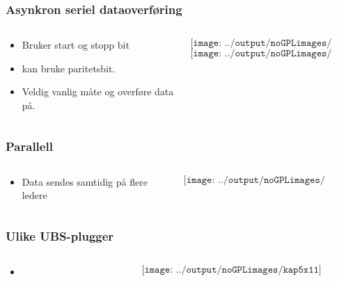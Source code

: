 \documentclass[aspectratio=169,xcolor=dvipsnames]{beamer}
\begin{document}
\begin{frame}
	\frametitle{Asynkron seriel dataoverføring}
	\begin{columns}
		\begin{column}{0.5\textwidth}

			\begin{itemize}
				\item Bruker start og stopp bit
				\item kan bruke paritetsbit. 
				\item Veldig vanlig måte og overføre data på. 
			\end{itemize}

			
		\end{column}

		\begin{column}{0.5\textwidth}
	$$\texttt{[image: ../output/noGPLimages/kap5x08]}$$
	$$\texttt{[image: ../output/noGPLimages/kap5x09]}$$
		\end{column}
	\end{columns}
\end{frame}
\begin{frame}
	\frametitle{Parallell}
	\begin{columns}
		\begin{column}{0.5\textwidth}

			\begin{itemize}
				\item Data sendes samtidig på flere ledere
			\end{itemize}

			
		\end{column}

		\begin{column}{0.5\textwidth}
	$$\texttt{[image: ../output/noGPLimages/kap5x10]}$$
		\end{column}
	\end{columns}
\end{frame}
\begin{frame}
	\frametitle{Ulike UBS-plugger}
	\begin{columns}
		\begin{column}{0.5\textwidth}

			\begin{itemize}
				\item      
			\end{itemize}

			
		\end{column}

		\begin{column}{0.5\textwidth}
	$$\texttt{[image: ../output/noGPLimages/kap5x11]}$$
		\end{column}
	\end{columns}
\end{frame}
\end{document}
